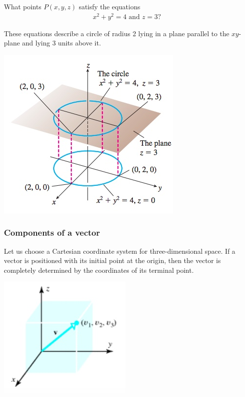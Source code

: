 \documentclass[12pt,letterpaper,reqno]{article}
\numberwithin{equation}{section}
\begin{document}
\begin{exercise}
	What points $P(x,y,z)$ satisfy the equations
	\begin{align*}
		x^2+y^2=4 \text{ and }z=3?
	\end{align*}
\end{exercise}

{\color{red}  These equations describe a circle of radius 2 lying in a plane parallel to the $xy$-plane and lying 3 units above it.}

\begin{center}
	\includegraphics[scale=0.5]{figures_mvc/circle_z=3}
\end{center}

\subsubsection{Components of a vector}
Let us choose a Cartesian coordinate system for three-dimensional space. If a vector is positioned with its initial point at the origin, then the vector is completely determined by the coordinates of its terminal point.

\begin{center}
	\includegraphics[scale=0.5]{figures_mvc/components}
\end{center}
\end{document}
